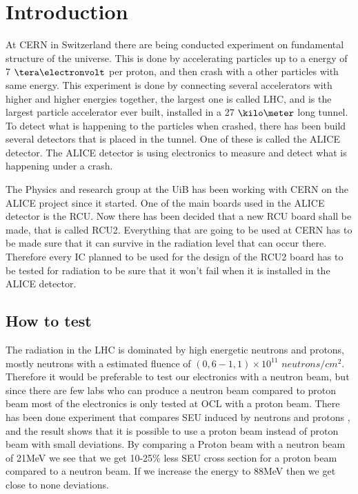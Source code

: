 \documentclass[12pt]{article}
\numberwithin{figure}{section}
\begin{document}
\newpage
\section{Introduction}
At \acf{CERN} in Switzerland there are being conducted experiment on fundamental structure of the universe. This is done by accelerating particles up to a energy of 7 $\tera \electronvolt$ per proton, and then crash with a other particles with same energy. This experiment is done by connecting several accelerators with higher and higher energies together, the largest one is called \acf{LHC}, and is the largest particle accelerator ever built, installed in a 27 $\kilo \meter$ long tunnel.
To detect what is happening to the particles when crashed, there has been build several detectors that is placed in the tunnel. One of these is called the \acf{ALICE} detector. The \ac{ALICE} detector is using electronics to measure and detect what is happening under a crash.

The Physics and research group at the \acf{UiB} has been working with \ac{CERN} on the \ac{ALICE} project since it started.
One of the main boards used in the \ac{ALICE} detector is the \acf{RCU}. Now there has been decided that a new \ac{RCU} board shall be made, that is called \ac{RCU2}.
Everything that are going to be used at \ac{CERN} has to be made sure that it can survive in the radiation level that can occur there. Therefore every \acf{IC} planned to be used for the design of the \ac{RCU2} board has to be tested for radiation to be sure that it won't fail when it is installed in the \ac{ALICE} detector.

\subsection{How to test}
\label{how_to_test}
The radiation in the \ac{LHC} is dominated by high energetic neutrons and protons, mostly neutrons with a estimated fluence of $(0,6-1,1)\times 10^{11}$ $neutrons/cm^2$. Therefore it would be preferable to test our electronics with a neutron beam, but since there are few labs who can produce a neutron beam compared to proton beam most of the electronics is only tested at \ac{OCL} with a proton beam.
There has been done experiment that compares SEU induced by neutrons and protons \cite{GranlundOlsson}, and the result shows that it is possible to use a proton beam instead of proton beam with small deviations. By comparing a Proton beam with a neutron beam of 21MeV we see that we get 10-25\% less SEU cross section for a proton beam compared to a neutron beam.
If we increase the energy to 88MeV then we get close to none deviations. 
\end{document}

